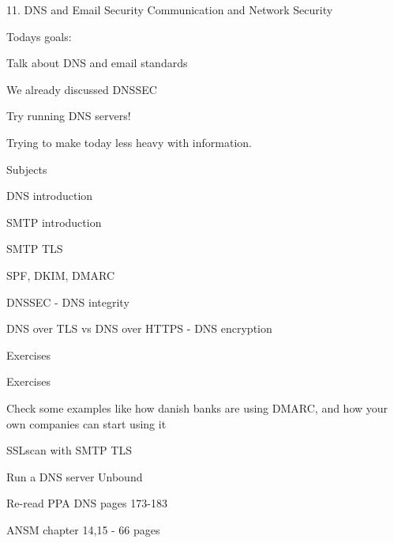 \documentclass[Screen16to9,17pt]{foils}
\begin{document}
\mytitlepage
{11. DNS and Email Security}
{Communication and Network Security \the\year}






Todays goals:
\begin{list2}
\item Talk about DNS and email standards
\item We already discussed DNSSEC
\item Try running DNS servers!
\end{list2}

Trying to make today less heavy with information.



\begin{list1}
\item Subjects
\begin{list2}
\item DNS introduction
\item SMTP introduction
\item SMTP TLS
\item SPF, DKIM, DMARC
\item DNSSEC - DNS integrity
\item DNS over TLS vs DNS over HTTPS - DNS encryption

Exercises
\end{list2}
\item Exercises
\begin{list2}
\item Check some examples like how danish banks are using DMARC, and how your own companies can start using it
\item SSLscan with SMTP TLS
\item Run a DNS server Unbound
\end{list2}
\end{list1}



\begin{list1}
\item Re-read PPA DNS pages 173-183
\item {}
\item {}
\item {}
\item ANSM chapter 14,15 - 66 pages
\end{list1}
\end{document}
